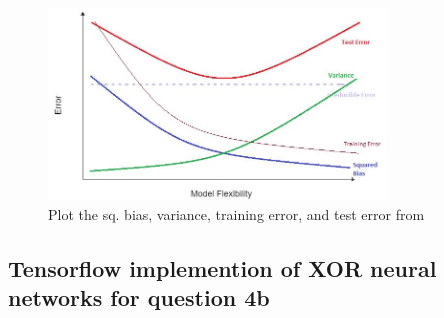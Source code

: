\documentclass{kthreport}
\begin{document}
\begin{figure}[!h]
    \centering
    \includegraphics[width=0.8\textwidth]{figs/bias-var-trade.jpg}
    \caption{
        Plot the sq. bias, variance, training error, and test error
        from \cite{the-bias-variance-tradeoff}
    }
    \label{fig:bias-vars-tradeoff}
\end{figure}

\pagebreak




\begin{appendices}
\chapter{Tensorflow implemention of XOR neural networks for question 4b}

\end{appendices}
\end{document}

